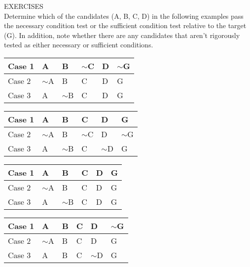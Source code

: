 \newpage
EXERCISES \\

Determine which of the candidates (A, B, C, D) in the
following examples pass the necessary condition test or the sufficient
condition test relative to the target (G). In addition, note whether there
are any candidates that aren't rigorously tested as either necessary or
sufficient conditions.

\begin{table}[htp]
\begin{tabular}{|l|l|l|l|l|l|}
\hline
Case 1 & A       & B       & $\sim$C & D & $\sim$G \\
\hline
Case 2 & $\sim$A & B       & C       & D & G       \\
\hline
Case 3 & A       & $\sim$B & C       & D & G      \\
\hline
\end{tabular}
\end{table}

\begin{table}[htp]
\begin{tabular}{|l|l|l|l|l|l|}
\hline
Case 1 & A       & B       & C       & D       & G       \\
\hline
Case 2 & $\sim$A & B       & $\sim$C & D       & $\sim$G \\
\hline
Case 3 & A       & $\sim$B & C       & $\sim$D & G  \\    
\hline
\end{tabular}
\end{table}

\begin{table}[htp]
\begin{tabular}{|l|l|l|l|l|l|}
\hline
Case 1 & A       & B       & C & D & G \\
\hline
Case 2 & $\sim$A & B       & C & D & G \\
\hline
Case 3 & A       & $\sim$B & C & D & G \\
\hline
\end{tabular}
\end{table}

\begin{table}[htp]
\begin{tabular}{|l|l|l|l|l|l|}
\hline
Case 1 & A       & B & C & D       & $\sim$G \\
\hline
Case 2 & $\sim$A & B & C & D       & G       \\
\hline
Case 3 & A       & B & C & $\sim$D & G   \\   
\hline
\end{tabular}
\end{table}

